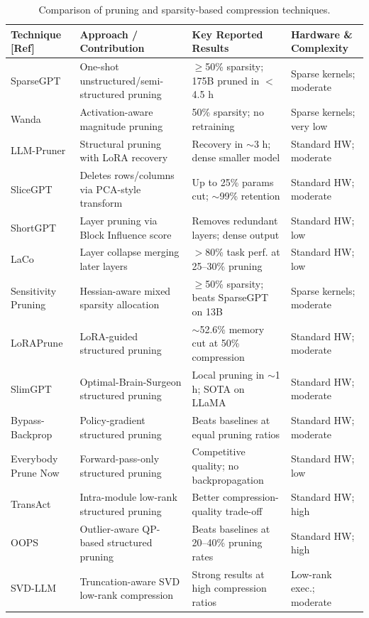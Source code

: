 \begin{table}[htbp]
\centering
\scriptsize
\caption{Comparison of pruning and sparsity-based compression techniques.}
\label{tab:lr-prune}
\renewcommand{\arraystretch}{1.2}
\begin{tabular}{p{}p{}p{}p{}}
\hline
\textbf{Technique [Ref]} & \textbf{Approach / Contribution} & \textbf{Key Reported Results} & \textbf{Hardware \& Complexity} \\
\hline
SparseGPT \cite{frantar2023sparsegpt} & One-shot unstructured/semi-structured pruning & $\geq$50\% sparsity; 175B pruned in $<$4.5 h & Sparse kernels; moderate \\
Wanda \cite{sun2024wanda} & Activation-aware magnitude pruning & 50\% sparsity; no retraining & Sparse kernels; very low \\
LLM-Pruner \cite{ma2023llmpruner} & Structural pruning with LoRA recovery & Recovery in $\sim$3 h; dense smaller model & Standard HW; moderate \\
SliceGPT \cite{ashkboos2024slicegpt} & Deletes rows/columns via PCA-style transform & Up to 25\% params cut; $\sim$99\% retention & Standard HW; moderate \\
ShortGPT \cite{men2024shortgpt} & Layer pruning via Block Influence score & Removes redundant layers; dense output & Standard HW; low \\
LaCo \cite{yang2024laco} & Layer collapse merging later layers & $>$80\% task perf. at 25--30\% pruning & Standard HW; low \\
Sensitivity Pruning \cite{shao2024sensitivity} & Hessian-aware mixed sparsity allocation & $\geq$50\% sparsity; beats SparseGPT on 13B & Sparse kernels; moderate \\
LoRAPrune \cite{zhang2024loraprune} & LoRA-guided structured pruning & $\sim$52.6\% memory cut at 50\% compression & Standard HW; moderate \\
SlimGPT \cite{ling2024slimgpt} & Optimal-Brain-Surgeon structured pruning & Local pruning in $\sim$1 h; SOTA on LLaMA & Standard HW; moderate \\
Bypass-Backprop \cite{gao2025bypass} & Policy-gradient structured pruning & Beats baselines at equal pruning ratios & Standard HW; moderate \\
Everybody Prune Now \cite{kolawole2026bonsai} & Forward-pass-only structured pruning & Competitive quality; no backpropagation & Standard HW; low \\
TransAct \cite{shen2024transact} & Intra-module low-rank structured pruning & Better compression-quality trade-off & Standard HW; high \\
OOPS \cite{survey2026oops} & Outlier-aware QP-based structured pruning & Beats baselines at 20--40\% pruning rates & Standard HW; high \\
SVD-LLM \cite{wang2025svdllm} & Truncation-aware SVD low-rank compression & Strong results at high compression ratios & Low-rank exec.; moderate \\
\hline
\end{tabular}
\end{table}

